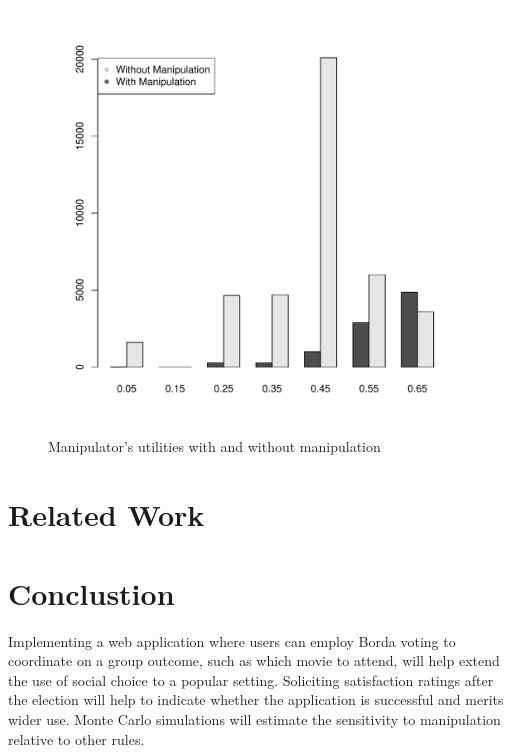 \documentclass[12pt,letterpaper]{article} %
\begin{document}
\begin{figure}
\begin{center}
\includegraphics[scale=0.3]{../graphics/manipulator-utilities.pdf}
\caption{Manipulator's utilities with and without manipulation}
\end{center}
\end{figure}


\section{Related Work}

\section{Conclustion}

Implementing a web application where users can employ Borda voting to coordinate on a group outcome, such as which movie to attend, will help extend the use of social choice to a popular setting. Soliciting satisfaction ratings after the election will help to indicate whether the application is successful and merits wider use. Monte Carlo simulations will estimate the sensitivity to manipulation relative to other rules. 
\end{document}
